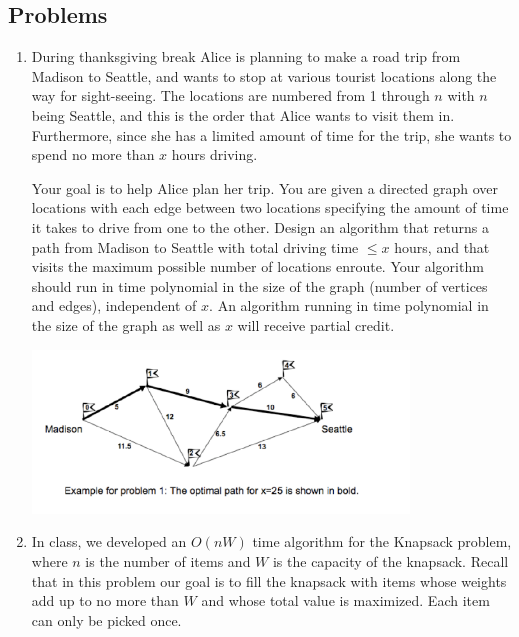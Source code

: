 \documentclass{article}
\begin{document}

\noindent
{}

\subsection*{Problems}

\begin{enumerate}
\item During thanksgiving break Alice is planning to make a road trip from Madison to Seattle, and wants to stop at various tourist locations along the way for sight-seeing. The locations are numbered from 1 through $n$
with $n$ being Seattle, and this is the order that Alice wants to visit them in. Furthermore, since she has a limited amount of time for the trip, she wants to spend no more than $x$ hours driving.

Your goal is to help Alice plan her trip. You are given a directed
graph over locations with each edge between two locations specifying
the amount of time it takes to drive from one to the other. Design an
algorithm that returns a path from Madison to Seattle with total
driving time $\le x$ hours, and that visits the maximum possible number of locations enroute. Your algorithm should run in time polynomial in the size of the graph (number of vertices and edges), independent of $x$. An algorithm running in time polynomial in the size of the graph as well as $x$ will receive partial credit.

\begin{center}
	\includegraphics[width=100mm]{graph.png}
\end{center}

\item In class, we developed an $O(nW)$ time algorithm for the
  Knapsack problem, where $n$ is the number of items and $W$ is the
  capacity of the knapsack. Recall that in this problem our goal is to
  fill the knapsack with items whose weights add up to no more than
  $W$ and whose total value is maximized. Each item can only be picked
  once.


\end{enumerate}
\end{document}
